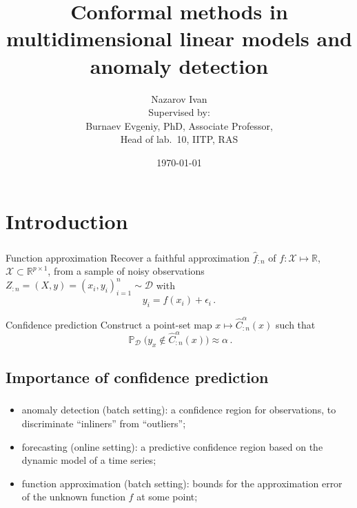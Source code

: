 \documentclass[t]{beamer}  %
\title{Conformal methods in multidimensional linear models and anomaly detection}
\author[Nazarov I.]{\small Nazarov Ivan\\
{\smaller \vspace{\baselineskip}
Supervised by:\\
Burnaev Evgeniy, PhD,
Associate Professor,\\
Head of lab.~10, IITP, RAS}}
\date{\small \today}
\institute[Higher School of Economics]{National Research University \\ Higher School of Economics}
\newcommand{\Dcal}{\mathcal{D}}
\newcommand{\Xcal}{\mathcal{X}}
\newcommand{\Real}{\mathbb{R}}
\newcommand{\ex}{\mathop{\mathbb{E}}\nolimits}
\newcommand{\pr}{\mathop{\mathbb{P}}\nolimits}
\begin{document}
\frame[plain]{\titlepage} %

\section{Introduction} %
\label{sec:introduction}

\begin{frame}[c]\frametitle{\insertsection}
  \begin{block}{Function approximation}
    Recover a faithful approximation $\hat{f}_{:n}$ of $f:\Xcal \mapsto \Real$, $\Xcal\subset \Real^{p\times 1}$,
    from a sample of noisy observations $Z_{:n} = (X,y) = (x_i, y_i)_{i=1}^n \sim \Dcal$ with
    $$ y_i = f(x_i) + \epsilon_i \,. $$
  \end{block}

  \begin{block}{Confidence prediction}
    Construct a point-set map $x \mapsto \hat{C}_{:n}^\alpha(x)$ such that
    $$ \pr_\Dcal\bigl(y_x \notin \hat{C}_{:n}^\alpha(x)\bigr) \approx \alpha \,. $$
  \end{block}
\end{frame}

\subsection{Importance of confidence prediction} %
\label{sub:importance_of_cp}

\begin{frame}[c]\frametitle{\insertsection}
  \framesubtitle{\insertsubsection}
  \begin{itemize}
    \item anomaly detection (batch setting): a confidence region for observations,
    to discriminate ``inliners'' from ``outliers'';
    \vspace{\baselineskip}
    \item forecasting (online setting): a predictive confidence region based on
    the dynamic model of a time series;
    \vspace{\baselineskip}
    \item function approximation (batch setting): bounds for the approximation
    error of the unknown function $f$ at some point;
  \end{itemize}
\end{frame}
\end{document}

